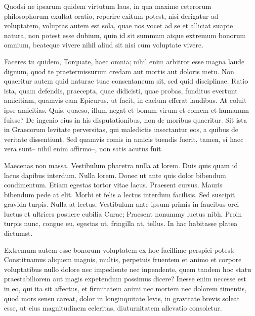 \documentclass[twoside]{extreport}
\begin{document}
Quodsi ne ipsarum quidem virtutum laus, in qua maxime ceterorum
philosophorum exultat oratio, reperire exitum potest, nisi derigatur ad
voluptatem, voluptas autem est sola, quae nos vocet ad se et alliciat
suapte natura, non potest esse dubium, quin id sit summum atque extremum
bonorum omnium, beateque vivere nihil aliud sit nisi cum voluptate
vivere.

Faceres tu quidem, Torquate, haec omnia; nihil enim arbitror esse magna
laude dignum, quod te praetermissurum credam aut mortis aut doloris
metu. Non quaeritur autem quid naturae tuae consentaneum sit, sed quid
disciplinae. Ratio ista, quam defendis, praecepta, quae didicisti, quae
probas, funditus evertunt amicitiam, quamvis eam Epicurus, ut facit, in
caelum efferat laudibus. At coluit ipse amicitias. Quis, quaeso, illum
negat et bonum virum et comem et humanum fuisse? De ingenio eius in his
disputationibus, non de moribus quaeritur. Sit ista in Graecorum
levitate perversitas, qui maledictis insectantur eos, a quibus de
veritate dissentiunt. Sed quamvis comis in amicis tuendis fuerit, tamen,
si haec vera sunt-- nihil enim affirmo--, non satis acutus fuit.

Maecenas non massa. Vestibulum pharetra nulla at lorem. Duis quis quam
id lacus dapibus interdum. Nulla lorem. Donec ut ante quis dolor
bibendum condimentum. Etiam egestas tortor vitae lacus. Praesent cursus.
Mauris bibendum pede at elit. Morbi et felis a lectus interdum
facilisis. Sed suscipit gravida turpis. Nulla at lectus. Vestibulum ante
ipsum primis in faucibus orci luctus et ultrices posuere cubilia Curae;
Praesent nonummy luctus nibh. Proin turpis nunc, congue eu, egestas ut,
fringilla at, tellus. In hac habitasse platea dictumst.

Extremum autem esse bonorum voluptatem ex hoc facillime perspici potest:
Constituamus aliquem magnis, multis, perpetuis fruentem et animo et
corpore voluptatibus nullo dolore nec impediente nec inpendente, quem
tandem hoc statu praestabiliorem aut magis expetendum possimus dicere?
Inesse enim necesse est in eo, qui ita sit affectus, et firmitatem animi
nec mortem nec dolorem timentis, quod mors sensu careat, dolor in
longinquitate levis, in gravitate brevis soleat esse, ut eius
magnitudinem celeritas, diuturnitatem allevatio consoletur.
\end{document}
